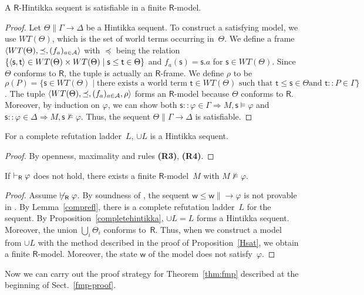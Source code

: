    \begin{proposition}
    \label{Hsat}
    A $\mathsf R$-Hintikka sequent is satisfiable in a finite $\mathsf R$-model.
   \end{proposition}
   \begin{proof}
    \newcommand{\W}{WT(\Theta)}
    Let $\Theta\parallel \Gamma\longrightarrow\Delta$ be a Hintikka sequent.
    To construct a satisfying model, we use $\W$,
    which is the set of world
    terms occurring in~$\Theta$.
    We define a frame $\tuple{\W, \preceq, (f_a)_{a\in\agents}}$ with
    $\preceq$ being the relation $\{\tuple{\mathsf s,\mathsf t}\in
    \W\times \W\mid
    \mathsf s\le
    \mathsf t\in\Theta\}$ and
    $f_a(\mathsf s) = \mathsf s.a$ for $\mathsf s\in\W$\enspace.
    Since $\Theta$ conforms to $\mathsf R$,
    the tuple is actually an $\mathsf R$-frame.
    We define $\rho$ to be $\rho(P) =
    \{\mathsf s\in \W\mid
    \mbox{there exists a world term } \mathsf t \in \W \mbox{ such that }
    \mathsf t\le
    \mathsf s \in \Theta\mbox{
    and }\mathsf t::P\in \Gamma\}$.
    The tuple $\tuple{\W,\preceq,(f_a)_{a\in \agents},\rho}$ forms
    an $\mathsf R$-model because $\Theta$ conforms to $\mathsf R$.
    Moreover, by induction on $\varphi$, we can show both
    $\mathsf s::\varphi\in\Gamma\Longrightarrow M,\mathsf s\models\varphi$
    and
    $\mathsf s::\varphi\in\Delta\Longrightarrow M,\mathsf s\not\models\varphi$.
    Thus, the sequent $\Theta\parallel \Gamma\longrightarrow\Delta$ is satisfiable.
   \end{proof}

   \begin{proposition}
    \label{completehintikka}
    For a complete refutation ladder~$L$,
    $\cup L$ is a Hintikka sequent.
   \end{proposition}
   \begin{proof}
    By openness, maximality and rules \textbf{(R3)}, \textbf{(R4)}.
   \end{proof}

   \begin{lemma}
    \label{R-fmp}
    If $\vdash_{\mathsf R}\varphi$  does not hold, there exists a finite $\mathsf
    R$-model~$M$ with $M\not\models\varphi$.
   \end{lemma}
   \begin{proof}
    Assume $\not\vdash_{\mathsf R}\varphi$.
    By soundness of \LB,
    the sequent $\mathsf w\le\mathsf w\parallel \longrightarrow\varphi$ is not
    provable in \LB.
    By Lemma~\ref{comprefl},
    there is a complete refutation ladder~$L$ for the sequent.
    By Proposition~\ref{completehintikka},
    $\cup L = L$  forms a Hintikka
    sequent.
    Moreover,
    the union $\bigcup_i\Theta_i$ conforms to~$\mathsf
    R$.
    Thus, when we construct a model from $\cup L$ with the method described in
    the proof of Proposition~\ref{Hsat},
    we obtain a finite $\mathsf R$-model.
    Moreover, the state $\mathsf w$ of the model does not satisfy~$\varphi$.
   \end{proof}
   Now we can carry out the proof strategy for Theorem~\ref{thm:fmp} described
   at the beginning of Sect.~\ref{fmp-proof}.

